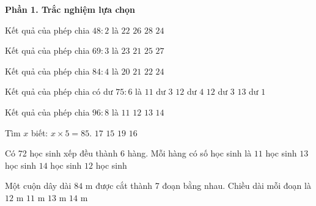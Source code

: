 \textbf{Phần 1. Trắc nghiệm lựa chọn}

\begin{ex} %
Kết quả của phép chia $48 : 2$ là
\choice
{$22$}
{$26$}
{$28$}
{\True $24$}
\end{ex}

\begin{ex} %
Kết quả của phép chia $69 : 3$ là
\choice
{\True $23$}
{$21$}
{$25$}
{$27$}
\end{ex}

\begin{ex} %
Kết quả của phép chia $84 : 4$ là
\choice
{$20$}
{\True $21$}
{$22$}
{$24$}
\end{ex}

\begin{ex} %
Kết quả của phép chia có dư $75 : 6$ là
\choice
{$11$ dư $3$}
{$12$ dư $4$}
{\True $12$ dư $3$}
{$13$ dư $1$}
\end{ex}

\begin{ex} %
Kết quả của phép chia $96 : 8$ là
\choice
{$11$}
{\True $12$}
{$13$}
{$14$}
\end{ex}

\begin{ex} %
Tìm $x$ biết: $x \times 5 = 85$.
\choice
{\True $17$}
{$15$}
{$19$}
{$16$}
\end{ex}

\begin{ex} %
Có 72 học sinh xếp đều thành 6 hàng. Mỗi hàng có số học sinh là
\choice
{$11$ học sinh}
{$13$ học sinh}
{$14$ học sinh}
{\True $12$ học sinh}
\end{ex}

\begin{ex} %
Một cuộn dây dài $84\text{ m}$ được cắt thành 7 đoạn bằng nhau. Chiều dài mỗi đoạn là
\choice
{\True $12\text{ m}$}
{$11\text{ m}$}
{$13\text{ m}$}
{$14\text{ m}$}
\end{ex}

